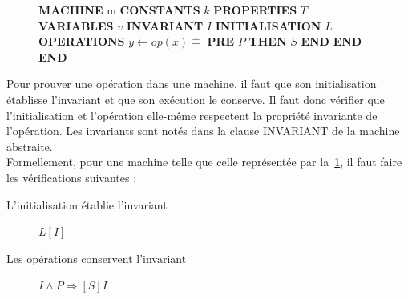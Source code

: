 \documentclass[10pt,a4paper]{article}
\newcommand{\Bequal}{\mathrel{\widehat{=}}}
\begin{document}
\setlength{\intextsep}{0pt}%
\setlength{\columnsep}{15pt}%
\begin{figure}
\noindent \textbf{MACHINE} m \newline
\textbf{CONSTANTS} $k$ \newline
\textbf{PROPERTIES} $T$ \newline
\textbf{VARIABLES} $v$ \newline
\textbf{INVARIANT} $I$ \newline
\textbf{INITIALISATION} $L$ \newline
\textbf{OPERATIONS} \newline
$y \leftarrow op(x) \Bequal$ \newline
\hspace*{1em}  \textbf{PRE} $P$ \textbf{THEN} $S$ \newline
\hspace*{2em} \textbf{END} \newline
\hspace*{1em} \textbf{END} \newline
\textbf{END}
\label{M1}
\end{figure}

Pour prouver une opération dans une machine, il faut que son initialisation établisse l'invariant et que son exécution le conserve. Il faut donc vérifier que l'initialisation et l'opération elle-même respectent la propriété invariante de l'opération. Les invariants sont notés dans la clause INVARIANT de la machine abstraite. \\

Formellement, pour une machine telle que celle représentée par la~\cref{M1}, il faut faire les vérifications suivantes :
\begin{description}
\item[L'initialisation établie l'invariant] $L[I]$ 
\item[Les opérations conservent l'invariant] $I \wedge P \Rightarrow [S]I$ 
\end{description}
\end{document}
